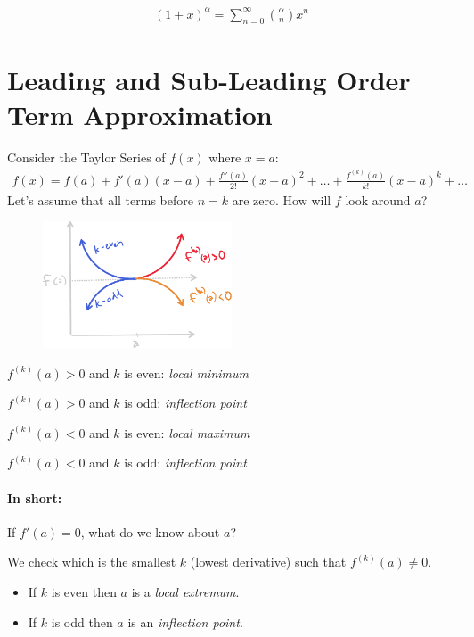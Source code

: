 \documentclass[00_complete]{subfiles}
\begin{document}
$$
\begin{gathered}
    (1+x)^\alpha = \sum_{n=0}^{\infty} \binom{\alpha}{n}x^n
\end{gathered}
$$

\section{Leading and Sub-Leading Order Term Approximation}

Consider the Taylor Series of $f(x)$ where $x=a$:
$$
\begin{gathered}
    f(x)=f(a)+f'(a)(x-a)+\frac{f''(a)}{2!}(x-a)^2 + \dots +
    \frac{f^{(k)}(a)}{k!}(x-a)^k + \dots
\end{gathered}
$$
Let's assume that all terms before $n=k$ are zero. How will $f$ look around
$a$?

\begin{figure}[ht]
  \centering
    \includegraphics[width=0.5\textwidth]{w6-order}
\end{figure}

$f^{(k)}(a) > 0$ and $k$ is even: \emph{local minimum}

$f^{(k)}(a) > 0$ and $k$ is odd: \emph{inflection point}

$f^{(k)}(a) < 0$ and $k$ is even: \emph{local maximum}

$f^{(k)}(a) < 0$ and $k$ is odd: \emph{inflection point}

\paragraph{In short:}

If $f'(a) = 0$, what do we know about $a$?

We check which is the smallest $k$ (lowest derivative) such that $f^{(k)}(a)
\neq 0$.

\begin{itemize}
\item If $k$ is even then $a$ is a \emph{local extremum}.
\item If $k$ is odd then $a$ is an \emph{inflection point}.
\end{itemize}
\end{document}
